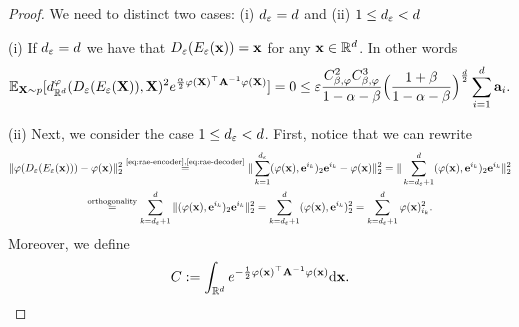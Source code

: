 \begin{proof}
    We need to distinct two cases: (i) $d_\varepsilon = d$ and (ii) $1 \leq d_\varepsilon < d$

    (i) If $d_\varepsilon = d$ we have that $D_\varepsilon(E_\varepsilon(\mathbf{x})) = \mathbf{x}$ for any $\mathbf{x}\in \mathbb{R}^d$. In other words
    \begin{equation}
        \mathbb{E}_{\mathbf{X} \sim p}[d_{\mathbb{R}^{d}}^\varphi (D_\varepsilon(E_\varepsilon(\mathbf{X})), \mathbf{X})^2 e^{\frac{\alpha}{2} \varphi(\mathbf{X})^\top \mathbf{A}^{-1} \varphi(\mathbf{X})}] = 0 \leq \varepsilon \frac{C^2_{\beta,\varphi} C^3_{\beta,\varphi}}{1 - \alpha - \beta} \Bigl(\frac{1 + \beta}{1 - \alpha - \beta} \Bigr)^{\frac{d}{2}} \sum_{i=1}^{d} \mathbf{a}_{i}.
    \end{equation}

    (ii) Next, we consider the case $1 \leq d_\varepsilon < d$.
    First, notice that we can rewrite 
    \begin{multline}
        \| \varphi(D_\varepsilon(E_\varepsilon(\mathbf{x}))) - \varphi(\mathbf{x}) \|_2^2 \overset{\text{\ref{eq:rae-encoder},\ref{eq:rae-decoder}}}{=} \|\sum_{k=1}^{d_\varepsilon} (\varphi(\mathbf{x}), \mathbf{e}^{i_k})_2 \mathbf{e}^{i_k} - \varphi(\mathbf{x})\|_2^2 = \|\sum_{k=d_\varepsilon+1}^{d} (\varphi(\mathbf{x}), \mathbf{e}^{i_k})_2 \mathbf{e}^{i_k}\|_2^2 \\
        \overset{\text{orthogonality}}{=} \sum_{k=d_\varepsilon+1}^{d} \|(\varphi(\mathbf{x}), \mathbf{e}^{i_k})_2 \mathbf{e}^{i_k}\|_2^2 = \sum_{k=d_\varepsilon+1}^{d}(\varphi(\mathbf{x}), \mathbf{e}^{i_k})_2^2 = \sum_{k=d_\varepsilon+1}^{d}\varphi(\mathbf{x})_{i_k}^2.
        \label{eq:rewrite-RAEx-x}
    \end{multline}
    Moreover, we define
    \begin{equation}
        C :=  \int_{\mathbb{R}^{d}} e^{-\frac{1}{2} \varphi(\mathbf{x})^\top \mathbf{A}^{-1} \varphi(\mathbf{x})} \mathrm{d} \mathbf{x}.
        \label{eq:RAEnormalizationConstant}
    \end{equation}
    

\end{proof}
